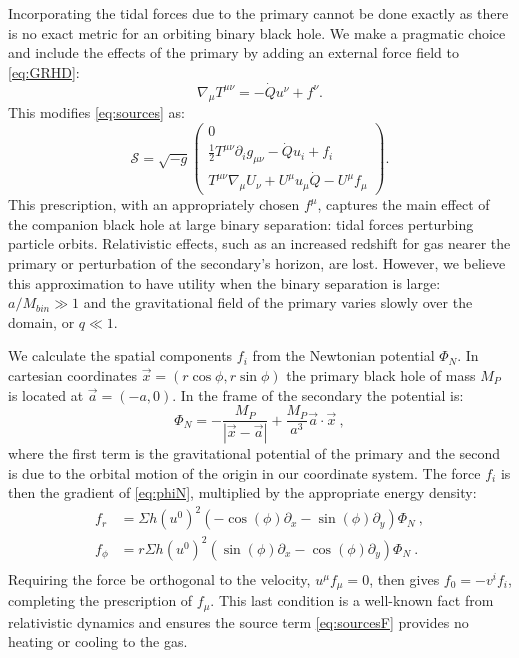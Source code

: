\documentclass{emulateapj}
\newcommand{\Sig}{\Sigma}
\newcommand{\pd}{\partial}
\begin{document}
Incorporating the tidal forces due to the primary cannot be done exactly as there is no exact metric for an orbiting binary black hole.  We make a pragmatic choice and include the effects of the primary by adding an external force field to \eqref{eq:GRHD}:
\begin{equation}
	\nabla_\mu T^{\mu\nu} = -\dot{Q} u^\nu + f^\nu . 
\end{equation}
This modifies \eqref{eq:sources} as:
\begin{equation}
	\mathcal{S} = \sqrt{-g} \begin{pmatrix} 0 \\
                        \frac{1}{2}T^{\mu\nu}\pd_i g_{\mu\nu} - \dot{Q}u_i  + f_i \\
                        T^{\mu\nu}\nabla_\mu U_\nu + U^\mu u_\mu \dot{Q} - U^\mu f_\mu \end{pmatrix} .\label{eq:sourcesF}
\end{equation}
This prescription, with an appropriately chosen $f^\mu$, captures the main effect of the companion black hole at large binary separation: tidal forces perturbing particle orbits.  Relativistic effects, such as an increased redshift for gas nearer the primary or perturbation of the secondary's horizon, are lost. However, we believe this approximation to have utility when the binary separation is large: $a/M_{bin} \gg 1$ and the gravitational field of the primary varies slowly over the domain, or $q \ll 1$.

We calculate the spatial components $f_i$ from the Newtonian potential $\Phi_N$.  In cartesian coordinates $\vec{x}=(r \cos \phi, r \sin \phi)$ the primary black hole of mass $M_P$ is located at $\vec a = (-a, 0)$.  In the frame of the secondary the potential is:
\begin{equation}
	\Phi_N = -\frac{M_P}{|\vec{x} -  \vec{a} |} + \frac{M_P}{a^3}  \vec{a} \cdot \vec{x} \ , \label{eq:phiN}
\end{equation}
where the first term is the gravitational potential of the primary and the second is due to the orbital motion of the origin in our coordinate system.  The force $f_i$ is then the gradient of \eqref{eq:phiN}, multiplied by the appropriate energy density:
\begin{align}
	f_r &= \Sig h (u^0)^2 \left( -\cos(\phi) \partial_x  - \sin(\phi)\partial_y\right) \Phi_N \ ,\nonumber \\
	f_\phi &= r\Sig h (u^0)^2 \left( \sin(\phi) \partial_x  -\cos(\phi)\partial_y\right) \Phi_N \ .\nonumber \\
\end{align}
Requiring the force be orthogonal to the velocity, $u^\mu f_\mu = 0$, then gives $f_0 = -v^i f_i$, completing the prescription of $f_\mu$. This last condition is a well-known fact from relativistic dynamics and ensures the source term \eqref{eq:sourcesF} provides no heating or cooling to the gas.
\end{document}
